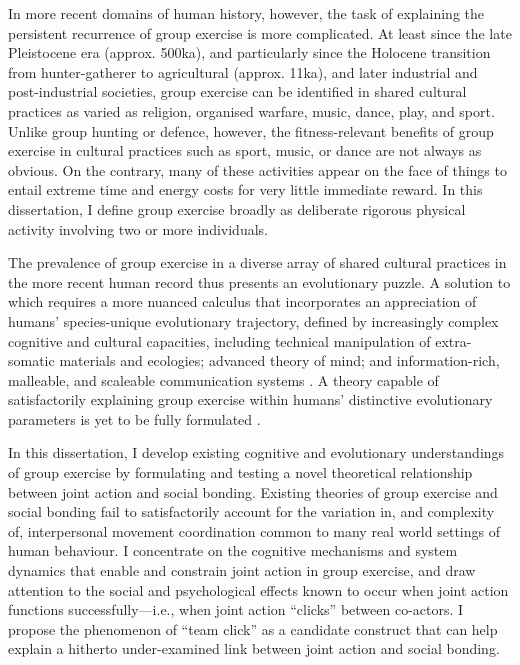 \begin{CJK}{UTF8}{gbsn}
In more recent domains of human history, however, the task of explaining the persistent recurrence of group exercise is more complicated.  At least since the late Pleistocene era (approx. 500ka), and particularly since the Holocene transition from hunter-gatherer to agricultural (approx. 11ka), and later industrial and post-industrial societies, group exercise can be identified in shared cultural practices as varied as religion, organised warfare, music, dance, play, and sport.  Unlike group hunting or defence, however, the fitness-relevant benefits of group exercise in cultural practices such as sport, music, or dance are not always as obvious.  On the contrary, many of these activities appear on the face of things to entail extreme time and energy costs for very little immediate reward.  In this dissertation, I define group exercise broadly as deliberate rigorous physical activity involving two or more individuals.

The prevalence of group exercise in a diverse array of shared cultural practices in the more recent human record thus presents an evolutionary puzzle.  A solution to which requires a more nuanced calculus that incorporates an appreciation of humans' species-unique evolutionary trajectory, defined by increasingly complex cognitive and cultural capacities, including technical manipulation of extra-somatic materials and ecologies; advanced theory of mind; and information-rich, malleable, and scaleable communication systems \citep{Roepstorff2010,Clark2015,Fuentes2016}.  A theory capable of satisfactorily explaining group exercise within humans' distinctive evolutionary parameters is yet to be fully formulated \citep{Cohen2017}.

In this dissertation, I develop existing cognitive and evolutionary understandings of group exercise by formulating and testing a novel theoretical relationship between joint action and social bonding.  Existing theories of group exercise and social bonding fail to satisfactorily account for the variation in, and complexity of, interpersonal movement coordination common to many real world settings of human behaviour.  I concentrate on the cognitive mechanisms and system dynamics that enable and constrain joint action in group exercise, and draw attention to the social and psychological effects known to occur when joint action functions successfully---i.e., when joint action ``clicks'' between co-actors.  I propose the phenomenon of ``team click'' as a candidate construct that can help explain a hitherto under-examined link between joint action and social bonding.


\end{CJK}
